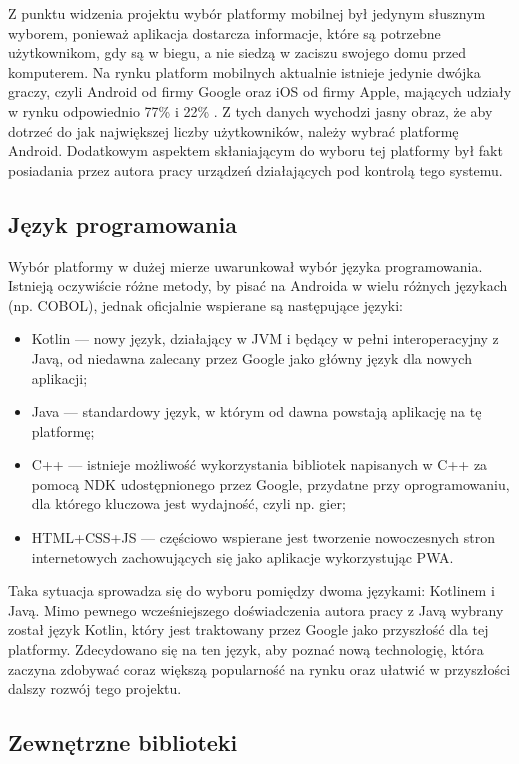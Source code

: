 \documentclass[polish,polish,a4paper,12pt]{article}
\begin{document}
	Z punktu widzenia projektu wybór platformy mobilnej był jedynym słusznym wyborem, ponieważ aplikacja dostarcza informacje, które są potrzebne użytkownikom, gdy są w biegu, a nie siedzą w zaciszu swojego domu przed komputerem. Na rynku platform mobilnych aktualnie istnieje jedynie dwójka graczy, czyli Android od firmy Google oraz iOS od firmy Apple, mających udziały w rynku odpowiednio 77\% i 22\% \cite{mobilemarketshare}. Z tych danych wychodzi jasny obraz, że aby dotrzeć do jak największej liczby użytkowników, należy wybrać platformę Android. Dodatkowym aspektem skłaniającym do wyboru tej platformy był fakt posiadania przez autora pracy urządzeń działających pod kontrolą tego systemu.

	\subsection{Język programowania}

	Wybór platformy w dużej mierze uwarunkował wybór języka programowania. Istnieją oczywiście różne metody, by pisać na Androida w wielu różnych językach (np. COBOL), jednak oficjalnie wspierane są następujące języki:

	\begin{itemize}
		\item Kotlin — nowy język, działający w JVM i będący w pełni interoperacyjny z Javą, od niedawna zalecany przez Google jako główny język dla nowych aplikacji;
		\item Java — standardowy język, w którym od dawna powstają aplikację na tę platformę;
		\item C++ — istnieje możliwość wykorzystania bibliotek napisanych w C++ za pomocą NDK udostępnionego przez Google, przydatne przy oprogramowaniu, dla którego kluczowa jest wydajność, czyli np. gier;
		\item HTML+CSS+JS — częściowo wspierane jest tworzenie nowoczesnych stron internetowych zachowujących się jako aplikacje wykorzystując PWA.
	\end{itemize}

	Taka sytuacja sprowadza się do wyboru pomiędzy dwoma językami: Kotlinem i Javą. Mimo pewnego wcześniejszego doświadczenia autora pracy z Javą wybrany został język Kotlin, który jest traktowany przez Google jako przyszłość dla tej platformy. Zdecydowano się na ten język, aby poznać nową technologię, która zaczyna zdobywać coraz większą popularność na rynku oraz ułatwić w przyszłości dalszy rozwój tego projektu.

	\subsection{Zewnętrzne biblioteki}
\end{document}
